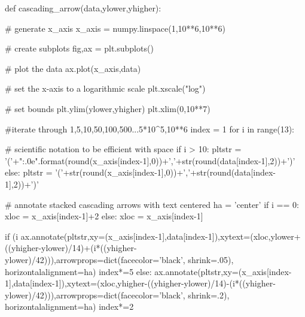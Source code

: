 \documentclass{article}
\begin{document}
\begin{python}
	def cascading_arrow(data,ylower,yhigher):
		
		# generate x_axis
		x_axis = numpy.linspace(1,10**6,10**6)
		
		# create subplots
		fig,ax = plt.subplots()

		# plot the data
		ax.plot(x_axis,data)

		# set the x-axis to a logarithmic scale
		plt.xscale("log")

		# set bounds
		plt.ylim(ylower,yhigher)
		plt.xlim(0,10**7)

		#iterate through 1,5,10,50,100,500...5*10^5,10**6
		index = 1
		for i in range(13):

			# scientific notation to be efficient with space
			if i > 10:
				pltstr = '('+"{:.0e}".format(round(x_axis[index-1],0))+','+str(round(data[index-1],2))+')'
			else:
				pltstr = '('+str(round(x_axis[index-1],0))+','+str(round(data[index-1],2))+')'
			
			# annotate stacked cascading arrows with text centered
			ha = 'center'
			if i == 0:
				xloc = x_axis[index-1]+2
			else:
				xloc = x_axis[index-1]

			if (i%
				ax.annotate(pltstr,xy=(x_axis[index-1],data[index-1]),xytext=(xloc,ylower+((yhigher-ylower)/14)+(i*((yhigher-ylower)/42))),arrowprops=dict(facecolor='black', shrink=.05), horizontalalignment=ha)
				index*=5
			else:
				ax.annotate(pltstr,xy=(x_axis[index-1],data[index-1]),xytext=(xloc,yhigher-((yhigher-ylower)/14)-(i*((yhigher-ylower)/42))),arrowprops=dict(facecolor='black', shrink=.2), horizontalalignment=ha)
				index*=2
\end{python}
\pagebreak
\end{document}
